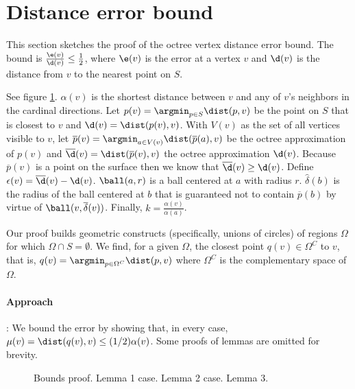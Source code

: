 \section{Distance error bound}
This section sketches the proof of the octree vertex distance error bound.  The bound is $\frac{\e(v)}{\d(v)} \le \frac{1}{2}$, where $\e(v)$ is the error at a vertex $v$ and $\d(v)$ is the distance from $v$ to the nearest point on $S$.

See figure \ref{fig:bound-proof}.  $\alpha(v)$ is the shortest distance between $v$ and any of $v$'s neighbors in the cardinal directions. Let $p(v) = \argmin_{p \in S} \dist(p,v)$ be the point on $S$ that is closest to $v$ and $\d(v) = \dist(p(v),v)$. With $V(v)$ as the set of all vertices visible to $v$, let $\overline{p}(v) = \argmin_{a \in V(v)} \dist(\overline{p}(a),v)$ be the octree approximation of $p(v)$ and $\overline{\d}(v) = \dist(\overline{p}(v), v)$ the octree approximation $\d(v)$. Because $\overline{p}(v)$ is a point on the surface then we know that $\overline{\d}(v) \ge \d(v)$. Define $\epsilon(v) = \overline{\d}(v)-\d(v)$.  $\ball(a,r)$ is a ball centered at $a$ with radius $r$. $\hat{\delta}(b)$ is the radius of the ball centered at $b$ that is guaranteed not to contain $\overline{p}(b)$ by virtue of $\ball(v, \overline{\delta}(v))$.  Finally, $k=\frac{\alpha(v)}{\alpha(a)}$.

Our proof builds geometric constructs (specifically, unions of circles) of regions $\Omega$ for which $\Omega \cap S = \emptyset$.  We find, for a given $\Omega$, the closest point $q(v) \in \Omega^C$ to $v$, that is, $q(v) = \argmin_{p \in \Omega^C} \dist(p, v)$ where $\Omega^C$ is the complementary space of $\Omega$.

\paragraph{Approach}: We bound the error by showing that, in every case, $\mu(v) = \dist(q(v),v) \le (1/2)\alpha(v)$.  Some proofs of lemmas are omitted for brevity.

\begin{figure}
  \centering
  \caption{Bounds proof.
    \protect{} Lemma 1 case.
    \protect{} Lemma 2 case.
    \protect{} Lemma 3.
  }
  \label{fig:bound-proof}
\end{figure}

